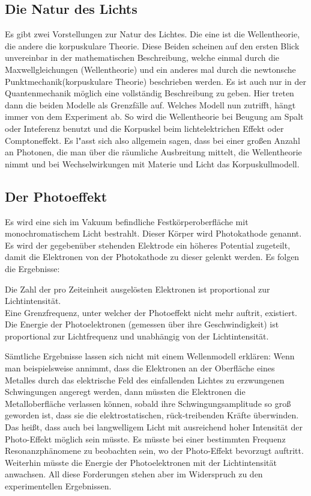 %
%
\subsection{Die Natur des Lichts}
Es gibt zwei Vorstellungen zur Natur des Lichtes. Die eine ist die Wellentheorie, die andere
die korpuskulare Theorie. Diese Beiden scheinen auf den ersten Blick unvereinbar in der mathematischen
Beschreibung, welche einmal durch die Maxwellgleichungen (Wellentheorie) und ein anderes
mal durch die newtonsche Punktmechanik(korpuskulare Theorie) beschrieben werden. Es ist auch nur in der Quantenmechanik
möglich eine vollständig Beschreibung zu geben. Hier treten dann die beiden
Modelle als Grenzfälle auf.
Welches Modell nun zutrifft, hängt immer von dem Experiment ab.
So wird die Wellentheorie bei Beugung am Spalt oder Inteferenz benutzt und die Korpuskel beim lichtelektrichen
Effekt oder Comptoneffekt. Es l"asst sich also allgemein sagen, dass bei einer großen Anzahl an
Photonen, die man über die räumliche Ausbreitung mittelt, die Wellentheorie nimmt und
bei Wechselwirkungen mit Materie und Licht das Korpuskullmodell.

\subsection{Der Photoeffekt}
Es wird eine sich im Vakuum befindliche Festkörperoberfläche mit monochromatischem
Licht bestrahlt. Dieser Körper wird Photokathode genannt. Es wird der gegebenüber stehenden Elektrode
ein höheres Potential zugeteilt, damit die Elektronen von der Photokathode zu dieser gelenkt werden.
Es folgen die Ergebnisse:
 \begin{description}

\item[Die Zahl der pro Zeiteinheit ausgelösten Elektronen ist proportional zur Lichtintensität.]

\item[Eine Grenzfrequenz, unter welcher der Photoeffekt nicht mehr auftrit, existiert.]

\item[Die Energie der Photoelektronen (gemessen über ihre Geschwindigkeit) ist proportional zur Lichtfrequenz und unabhängig von der Lichtintensität.]

 \end{description}

Sämtliche Ergebnisse lassen sich nicht mit einem Wellenmodell erklären:
Wenn man beispielsweise annimmt, dass die Elektronen an der Oberfläche eines Metalles durch das elektrische Feld des einfallenden Lichtes zu erzwungenen Schwingungen angeregt werden, dann müssten die Elektronen die Metalloberfläche verlassen können, sobald ihre Schwingungsamplitude so groß geworden ist, dass sie die elektrostatischen, rück-treibenden Kräfte überwinden. Das heißt, dass auch bei langwelligem Licht mit ausreichend hoher Intensität der Photo-Effekt möglich sein müsste. Es müsste bei einer bestimmten Frequenz Resonanzphänomene zu beobachten sein, wo der Photo-Effekt bevorzugt auftritt. Weiterhin müsste die Energie der Photoelektronen mit der Lichtintensität anwachsen. All diese Forderungen stehen aber im Widerspruch zu den experimentellen Ergebnissen.

